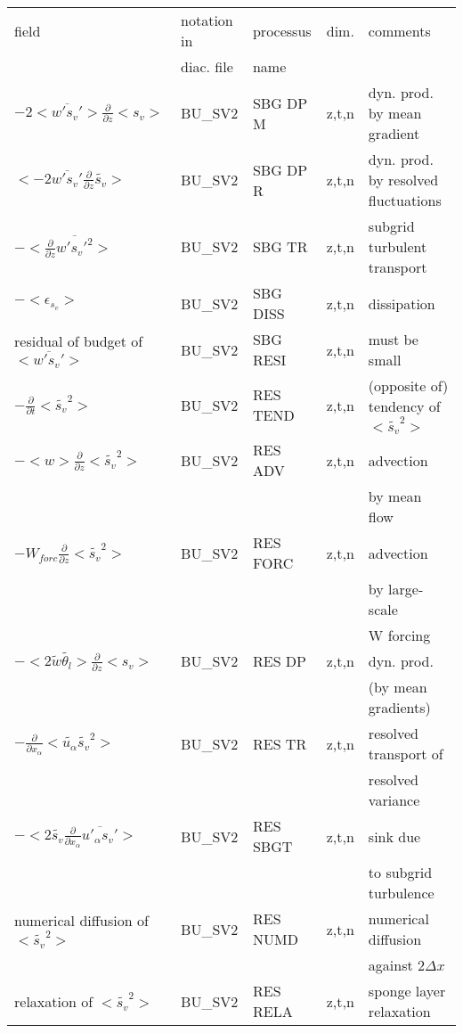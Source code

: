 \begin{center}
\begin{tabular}{||p{5cm}|>{\centering}p{2cm}|>{\centering}p{2.5cm}|>{\centering}p{0.5cm}|p{5.5cm }||}
\hline
\hline
field & notation in & processus & dim.  & comments \\
      & diac. file & name      &            & \\
\hline
\hline
$- 2 <\overline{w's_v'}>\frac{\partial }{\partial z}<s_v>$ & BU\_SV2 & SBG DP M & z,t,n & dyn. prod. by mean gradient \\
\hline
$<-2 \overline{w's_v'}\frac{\partial}{\partial z}\tilde{s_v}>$ & BU\_SV2 & SBG DP R & z,t,n & dyn. prod. by resolved fluctuations\\
\hline
$-<\frac{\partial}{\partial z}\overline{w's_v'^2}>$ & BU\_SV2 & SBG TR   & z,t,n & subgrid turbulent transport\\
\hline
$-<\epsilon_{s_v}>$ & BU\_SV2 & SBG DISS & z,t,n & dissipation \\
\hline
{\rm residual of budget of} $<\overline{w's_v'}>$ & BU\_SV2 & SBG RESI & z,t,n & must be small \\
\hline
$-\frac{\partial }{\partial t}<\tilde{s_v}^2>$ & BU\_SV2 & RES TEND & z,t,n & (opposite of) tendency of $<\tilde{s_v}^2>$\\
\hline
$-<w>\frac{\partial}{\partial z}<\tilde{s_v}^2>$ & BU\_SV2 & RES ADV  & z,t,n & advection \\
 & & & & by mean flow\\
\hline
$-W_{forc}\frac{\partial}{\partial z}<\tilde{s_v}^2>$ & BU\_SV2 & RES FORC & z,t,n & advection \\
 & & & & by large-scale\\
 & & & & W forcing\\
\hline
$-< 2 \tilde{w}\tilde{\theta_l}>\frac{\partial }{\partial z}<s_v>$ & BU\_SV2 & RES DP   & z,t,n & dyn. prod.\\
 & & & &(by mean gradients) \\
\hline
$-\frac{\partial}{\partial x_\alpha} <\tilde{u_\alpha} \tilde{s_v}^2>$ & BU\_SV2 & RES TR   & z,t,n & resolved transport of\\
 & & & &resolved variance \\
\hline
$- <2 \tilde{s_v}\frac{\partial}{\partial x_\alpha}\overline{u'_\alpha s_v'}>$
& BU\_SV2 & RES SBGT & z,t,n & sink due \\
 & & & &to subgrid turbulence \\
\hline
{\rm numerical diffusion of } $<\tilde{s_v}^2>$& BU\_SV2 & RES NUMD & z,t,n & numerical diffusion\\
 & & & &against $2\Delta x$ \\
\hline
{\rm relaxation of }$<\tilde{s_v}^2>$ & BU\_SV2 & RES RELA & z,t,n& sponge layer relaxation \\
\hline\hline

\end{tabular}
\end{center}


